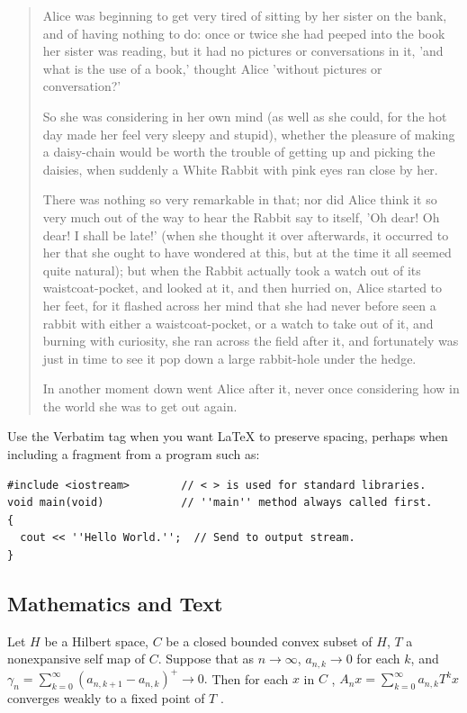 \documentclass{article}
\begin{document}
\begin{quotation}
Alice was beginning to get very tired of sitting by her sister on the bank,
and of having nothing to do: once or twice she had peeped into the book her
sister was reading, but it had no pictures or conversations in it, 'and what
is the use of a book,' thought Alice 'without pictures or conversation?'

So she was considering in her own mind (as well as she could, for the hot
day made her feel very sleepy and stupid), whether the pleasure of making a
daisy-chain would be worth the trouble of getting up and picking the
daisies, when suddenly a White Rabbit with pink eyes ran close by her.

There was nothing so very remarkable in that; nor did Alice think it so very
much out of the way to hear the Rabbit say to itself, 'Oh dear! Oh dear! I
shall be late!' (when she thought it over afterwards, it occurred to her
that she ought to have wondered at this, but at the time it all seemed quite
natural); but when the Rabbit actually took a watch out of its
waistcoat-pocket, and looked at it, and then hurried on, Alice started to
her feet, for it flashed across her mind that she had never before seen a
rabbit with either a waistcoat-pocket, or a watch to take out of it, and
burning with curiosity, she ran across the field after it, and fortunately
was just in time to see it pop down a large rabbit-hole under the hedge.

In another moment down went Alice after it, never once considering how in
the world she was to get out again.
\end{quotation}

Use the Verbatim tag when you want \LaTeX{} to preserve spacing, perhaps
when including a fragment from a program such as:
\begin{verbatim}
#include <iostream>        // < > is used for standard libraries.
void main(void)            // ''main'' method always called first.
{
  cout << ''Hello World.'';  // Send to output stream.
}
\end{verbatim}

\subsection{Mathematics and Text}

Let $H$ be a Hilbert space, $C$ be a closed bounded convex subset of $H$, $T$
a nonexpansive self map of $C$. Suppose that as $n\rightarrow \infty $, $%
a_{n,k}\rightarrow 0$ for each $k$, and $\gamma _{n}=\sum_{k=0}^{\infty
}\left( a_{n,k+1}-a_{n,k}\right) ^{+}\rightarrow 0.$ Then for each $x$ in $C$%
, $A_{n}x=\sum_{k=0}^{\infty }a_{n,k}T^{k}x$ converges weakly to a fixed
point of $T$ .
\end{document}
